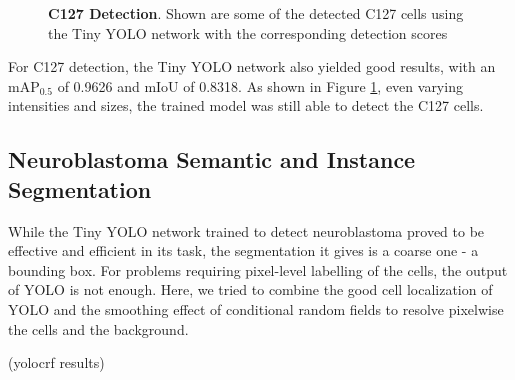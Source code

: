 \documentclass[journal]{IEEEtran}
\begin{document}
\begin{figure}
\begin{subfigure}[b]{0.9\linewidth}
\caption{}
\end{subfigure}
\caption{\textbf{C127 Detection}. Shown are some of the detected C127 cells using the Tiny YOLO network with the corresponding detection scores}
\label{fig:c127_yolo_results}
\end{figure}
For C127 detection, the Tiny YOLO network also yielded good results, with an mAP$_{0.5}$ of 0.9626 and mIoU of 0.8318. As shown in Figure \ref{fig:c127_yolo_results}, even varying intensities and sizes, the trained model was still able to detect the C127 cells.
\subsection{Neuroblastoma Semantic and Instance Segmentation}
While the Tiny YOLO network trained to detect neuroblastoma proved to be effective and efficient in its task, the segmentation it gives is a coarse one - a bounding box. For problems requiring pixel-level labelling of the cells, the output of YOLO is not enough. Here, we tried to combine the good cell localization of YOLO and the smoothing effect of conditional random fields to resolve pixelwise the cells and the background.

(yolocrf results)
\end{document}
